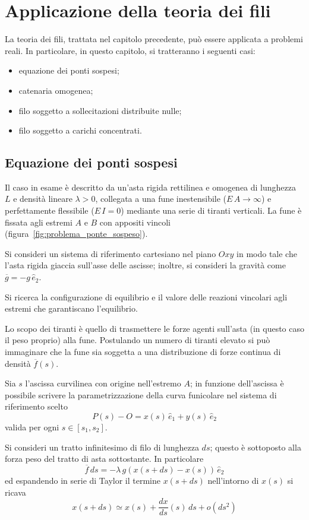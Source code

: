 \chapter{Applicazione della teoria dei fili}\label{chapter:applicazione_teoria_fili}

La teoria dei fili, trattata nel capitolo precedente, può essere applicata a problemi reali. 
In particolare, in questo capitolo, si tratteranno i seguenti casi:
\begin{itemize}
 \item equazione dei ponti sospesi;
 \item catenaria omogenea;
 \item filo soggetto a sollecitazioni distribuite nulle;
 \item filo soggetto a carichi concentrati.
\end{itemize}

\section{Equazione dei ponti sospesi}
Il caso in esame è descritto da un'asta rigida rettilinea e omogenea di lunghezza $L$ e densità lineare $\lambda>0$, collegata a una fune inestensibile ($E\,A \to\infty$) e perfettamente flessibile ($E\,I=0$) mediante una serie di tiranti verticali. La fune è fissata agli estremi $A$ e $B$ con appositi vincoli (figura~\ref{fig:problema_ponte_sospeso}). 

Si consideri un sistema di riferimento cartesiano nel piano $Oxy$ in modo tale che l'asta rigida giaccia sull'asse delle ascisse; inoltre, si consideri la gravità come $\overline{g} = - g\,\hat{e}_2$.

Si ricerca la configurazione di equilibrio e il valore delle reazioni vincolari agli estremi che garantiscano l'equilibrio.

Lo scopo dei tiranti è quello di trasmettere le forze agenti sull'asta (in questo caso il peso proprio) alla fune. Postulando un numero di tiranti elevato si può immaginare che la fune sia soggetta a una distribuzione di forze continua di densità $\overline{f}(s)$.

Sia $s$ l'ascissa curvilinea con origine nell'estremo $A$; in funzione dell'ascissa è possibile scrivere la parametrizzazione della curva funicolare nel sistema di riferimento scelto
\[
 P(s) - O = x(s)\,\hat{e}_1 + y(s)\,\hat{e}_2
\]
valida per ogni $s\in[s_1, s_2]$.

Si consideri un tratto infinitesimo di filo di lunghezza $ds$; questo è sottoposto alla forza peso del tratto di asta sottostante. In particolare
\[
 \overline{f}\,ds = -\lambda\,g\left(x(s+ds) - x(s)\right)\,\hat{e}_2 
\]
ed espandendo in serie di Taylor il termine $x(s+ds)$ nell'intorno di $x(s)$ si ricava
\[
 x(s+ds)\simeq x(s) + \dfrac{dx}{ds}(s)\,ds + o(ds^2)
\]

